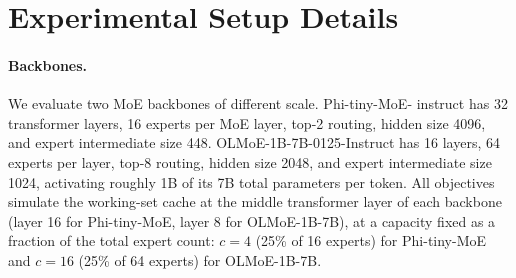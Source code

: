\documentclass{article}
\begin{document}
\appendix

\section{Experimental Setup Details}
\label{app:setup}

\paragraph{Backbones.} We evaluate two MoE backbones of different scale. Phi-tiny-MoE-
instruct has 32 transformer layers, 16 experts per MoE layer, top-2 routing, hidden size
4096, and expert intermediate size 448. OLMoE-1B-7B-0125-Instruct has 16 layers, 64
experts per layer, top-8 routing, hidden size 2048, and expert intermediate size 1024,
activating roughly 1B of its 7B total parameters per token. All objectives simulate the
working-set cache at the middle transformer layer of each backbone (layer 16 for
Phi-tiny-MoE, layer 8 for OLMoE-1B-7B), at a capacity fixed as a fraction of the total
expert count: $c=4$ (25\% of 16 experts) for Phi-tiny-MoE and $c=16$ (25\% of 64 experts)
for OLMoE-1B-7B.
\end{document}
